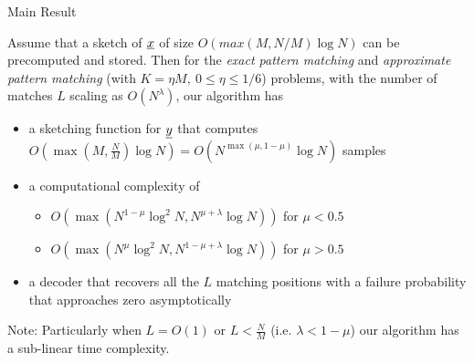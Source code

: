 	 \begin{frame}{Main Result}
	 	
	 \begin{theorem}
	 	Assume that a sketch of $\underline{x}$ of size $O(max(M,N/M)\log N)$ can be precomputed and stored. Then for the {\it exact pattern matching} and {\it approximate pattern matching} (with $K = \eta M,~ 0 \leq \eta \leq 1/6$) problems, with the number of matches $L$ scaling as $O(N^{\lambda})$, our algorithm has
	 	\begin{itemize}
	 		\item a sketching function for $\underline{y}$ that computes {\color{blue} $O(\max(M,\frac{N}{M})\log N)=O(N^{\max(\mu,1-\mu)}\log N)$} \alert{samples}
	 		\item a \alert{computational complexity} of 
	 		\begin{itemize}
	 			\item	{\color{blue}$O(\max(N^{1-\mu}\log^2 N, N^{\mu+\lambda}\log N ))$} for {\color{blue}$\mu < 0.5$}
	 			\item	{\color{blue}$O(\max(N^{\mu}\log^2 N, N^{1-\mu +\lambda}\log N ))$} for {\color{blue}$\mu > 0.5$}
	 		\end{itemize}
	 		\item a decoder that recovers all the $L$ matching positions with a {\color{blue}failure probability that approaches zero asymptotically} 
	 	\end{itemize}
	 	
	 	\vspace{10 pt}
	 	{\color{alert}Note:} Particularly when $L=O(1)$ or $L<\frac{N}{M}$ (i.e. $\lambda<1-\mu$) our algorithm has a {\color{blue}sub-linear time} complexity.
	 \end{theorem}	 
\end{frame}	 


